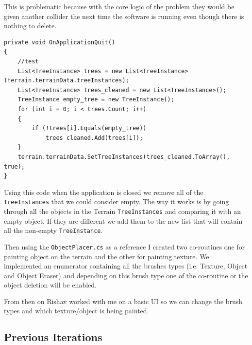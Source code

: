 This is problematic because with the core logic of the problem they would be given another collider the next time the software is running even though there is nothing to delete.

\begin{verbatim}
private void OnApplicationQuit()
{
    //test
    List<TreeInstance> trees = new List<TreeInstance>(terrain.terrainData.treeInstances);
    List<TreeInstance> trees_cleaned = new List<TreeInstance>();
    TreeInstance empty_tree = new TreeInstance();
    for (int i = 0; i < trees.Count; i++)
    {
        if (!trees[i].Equals(empty_tree))
            trees_cleaned.Add(trees[i]);
    }
    terrain.terrainData.SetTreeInstances(trees_cleaned.ToArray(), true);
}
\end{verbatim}

Using this code when the application is closed we remove all of the \texttt{TreeInstances} that we could consider empty. The way it works is by going through all the objects in the Terrain \texttt{TreeInstances}  and comparing it with an empty object. If they are different we add them to the new list that will contain all the non-empty \texttt{TreeInstance}.

Then using the \texttt{ObjectPlacer.cs} as a reference I created two co-routines one for painting object on the terrain and the other for painting texture. We implemented an enumerator containing all the brushes types (i.e. Texture, Object and Object Eraser) and depending on this brush type one of the co-routine or the object deletion will be enabled.

From then on Rishav worked with me on a basic UI so we can change the brush types and which texture/object is being painted.

\subsection{Previous Iterations}
